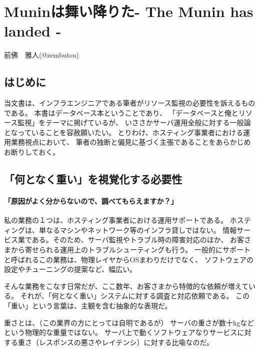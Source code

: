 
\chapter{Muninは舞い降りた- The Munin has landed -}

\begin{flushright}
 前佛　雅人(@zembutsu) %
\end{flushright}

\section{はじめに}

当文書は、インフラエンジニアである筆者がリソース監視の必要性を訴えるものである。
本書はデータベース本ということであり、
「データベースと俺とリソース監視」をテーマに掲げているが、
いささかサーバ運用全般に対する一般論となっていることを容赦願いたい。
とりわけ、ホスティング事業者における運用業務視点において、
筆者の独断と偏見に基づく主張であることをあらかじめお断りしておく。

\section{「何となく重い」を視覚化する必要性}
\subsubsection{「原因がよく分からないので、調べてもらえますか？」}
私の業務の１つは、ホスティング事業者における運用サポートである。
ホスティングは、単なるマシンやネットワーク等のインフラ貸しではない。
情報サービス業である。そのため、サーバ監視やトラブル時の障害対応のほか、
お客さまから寄せられる運用上のトラブルシューティングも行う。
一般的にサポートと呼ばれるこの業務は、物理レイヤからOSまわりだけでなく、
ソフトウェアの設定やチューニングの提案など、幅広い。

そんな業務をこなす日常だが、ここ数年、お客さまから特徴的な依頼が増えている。
それが、「何となく重い」システムに対する調査と対応依頼である。
この「重い」という言葉は、主観を含む抽象的な表現だ。

重さとは、（この業界の方にとっては自明であるが）
サーバの重さが数十kgなどという物理的な重量ではない。
サーバ上で動くソフトウェアなりサービスに対する重さ（レスポンスの悪さやレイテンシ）に対する比喩なのだ。

